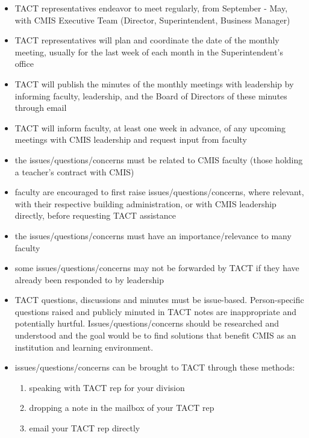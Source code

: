 \documentclass{report}
\begin{document}
\begin{itemize}
\item TACT representatives endeavor to meet regularly, from September - May, with CMIS Executive Team (Director, Superintendent, Business Manager)
\item TACT representatives will plan and coordinate the date of the monthly meeting, usually for the last week of each month in the Superintendent's office
\end{itemize}

\begin{itemize}
\item TACT will publish the minutes of the monthly meetings with leadership by informing faculty, leadership, and the Board of Directors of these minutes through email
\item TACT will inform faculty, at least one week in advance,  of any upcoming meetings with CMIS leadership and request input from faculty
\end{itemize}

\begin{itemize}
\item the issues/questions/concerns must be related to CMIS faculty (those holding a teacher's contract with CMIS)
\item faculty are encouraged to first raise issues/questions/concerns, where relevant, with their respective building administration, or with CMIS leadership directly, before requesting TACT assistance
\item the issues/questions/concerns must have an importance/relevance to many faculty
\item some issues/questions/concerns may not be forwarded by TACT if they have already been responded to by leadership
\item TACT questions, discussions and minutes must be issue-based.  Person-specific questions raised and publicly minuted in TACT notes are inappropriate and potentially hurtful. Issues/questions/concerns should be researched and understood and the goal would be to find solutions that benefit CMIS as an institution and learning environment.
\item issues/questions/concerns can be brought to TACT through these methods:
\begin{enumerate}
\item speaking with TACT rep for your division
\item dropping a note in the mailbox of your TACT rep
\item email your TACT rep directly
\end{enumerate}
\end{itemize}
\end{document}
